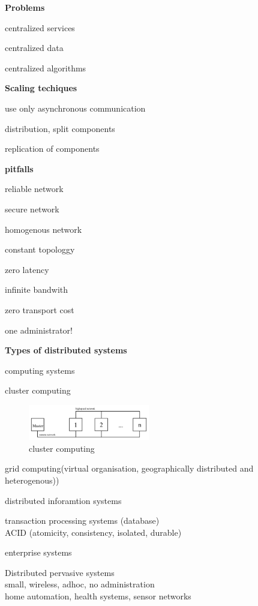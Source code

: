 \documentclass[ngerman,a4paper]{report}
\begin{document}
\textbf{Problems}

\begin{compactitem}
\item centralized services
\item centralized data
\item centralized algorithms
\end{compactitem}

\textbf{Scaling techiques}

\begin{compactitem}
\item use only asynchronous communication
\item distribution, split components
\item replication of components
\end{compactitem}

\textbf{pitfalls}

\begin{compactenum}
\item reliable network
\item secure network
\item homogenous network
\item constant topologgy
\item zero latency
\item infinite bandwith
\item zero transport cost
\item one administrator!
\end{compactenum}

\textbf{Types of distributed systems}
\begin{compactitem}
\item computing systems
\begin{compactitem}
\item cluster computing
\begin{figure}[h]
	\centering
	\includegraphics[width=200px]{gfx/cluster_computing.png}
	\caption{cluster computing}
	\label{img:cluster_comp}
\end{figure}
\item grid computing(virtual organisation, geographically distributed and heterogenous))
\end{compactitem}
\item distributed inforamtion systems
\begin{compactitem}
\item transaction processing systems (database) \\
ACID (atomicity, consistency, isolated, durable)
\item enterprise systems
\end{compactitem}
\item Distributed pervasive systems\\
small, wireless, adhoc, no administration\\
home automation, health systems, sensor networks
\end{compactitem}
\end{document}

